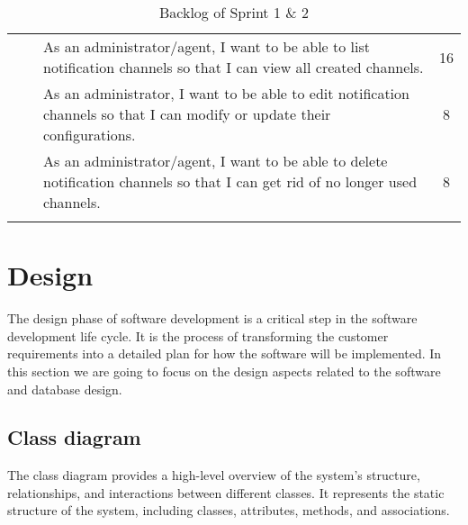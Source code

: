 \begin{longtable}{ | m{}  | m{} | m{} | c | }
    \cline{3-4}
                            &                                                     & As an administrator/agent, I want to be able to list notification channels so that I can view all created channels.                   & 16                  \\
    \cline{3-4}
                            &                                                     & As an administrator, I want to be able to edit notification channels so that I can modify or update their configurations.             & 8                   \\
    \cline{3-4}
                            &                                                     & As an administrator/agent, I want to be able to delete notification channels so that I can get rid of no longer used channels.        & 8                   \\
    \hline
    \caption{Backlog of Sprint 1 \& 2}
\end{longtable}

\section{Design}
The design phase of software development is a critical step in the software development life cycle.
It is the process of transforming the customer requirements into a detailed plan for how the software
will be implemented. In this section we are going to focus on the design aspects related to the software
and database design.

\subsection{Class diagram}
The class diagram provides a high-level overview of the system's structure, relationships,
and interactions between different classes. It represents the static structure of the system,
including classes, attributes, methods, and associations.

